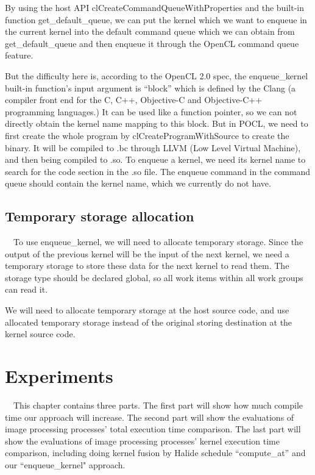 \documentclass{sigplanconf}
\begin{document}
	By using the host API clCreateCommandQueueWithProperties and the built-in function get\_default\_queue, we can put the kernel which we want to enqueue in the current kernel into the default command queue which we can obtain from get\_default\_queue and then enqueue it through the OpenCL command queue feature.
	
	But the difficulty here is, according to the OpenCL 2.0 spec, the enqueue\_kernel built-in function’s input argument is “block” which is defined by the Clang (a compiler front end for the C, C++, Objective-C and Objective-C++ programming languages.) It can be used like a function pointer, so we can not directly obtain the kernel name mapping to this block. But in POCL, we need to first create the whole program by clCreateProgramWithSource to create the binary. It will be compiled to .bc through LLVM (Low Level Virtual Machine), and then being compiled to .so. To enqueue a kernel, we need its kernel name to search for the code section in the .so file. The enqueue command in the command queue should contain the kernel name, which we currently do not have.
	
\subsection{Temporary storage allocation}
\quad\ \ To use enqueue\_kernel, we will need to allocate temporary storage. Since the output of the previous kernel will be the input of the next kernel, we need a temporary storage to store these data for the next kernel to read them. The storage type should be declared global, so all work items within all work groups can read it.

    We will need to allocate temporary storage at the host source code, and use allocated temporary storage instead of the original storing destination at the kernel source code.

\section{Experiments}
\quad\ \ This chapter contains three parts. The first part will show how much compile time our approach will increase. The second part will show the evaluations of image processing processes' total execution time comparison. The last part will show the evaluations of image processing processes' kernel execution time comparison, including doing kernel fusion by Halide schedule “compute\_at” and our “enqueue\_kernel" approach.
\end{document}
